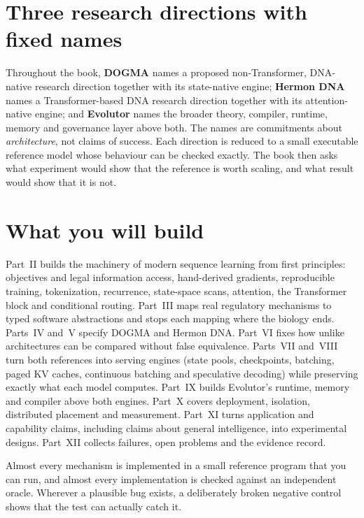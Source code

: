 \section*{Three research directions with fixed names}
Throughout the book, \textbf{DOGMA} names a proposed non-Transformer, DNA-native research
direction together with its state-native engine; \textbf{Hermon DNA} names a
Transformer-based DNA research direction together with its attention-native engine; and
\textbf{Evolutor} names the broader theory, compiler, runtime, memory and governance layer
above both. The names are commitments about \emph{architecture}, not claims of success.
Each direction is reduced to a small executable reference model whose behaviour can be
checked exactly. The book then asks what experiment would show that the reference is worth
scaling, and what result would show that it is not.

\section*{What you will build}
Part~II builds the machinery of modern sequence learning from first principles:
objectives and legal information access, hand-derived gradients, reproducible training,
tokenization, recurrence, state-space scans, attention, the Transformer block and
conditional routing. Part~III maps real regulatory mechanisms to typed software
abstractions and stops each mapping where the biology ends. Parts~IV and~V specify DOGMA
and Hermon DNA. Part~VI fixes how unlike architectures can be compared without false
equivalence. Parts~VII and~VIII turn both references into serving engines (state pools,
checkpoints, batching, paged KV caches, continuous batching and speculative decoding)
while preserving exactly what each model computes. Part~IX builds Evolutor's runtime,
memory and compiler above both engines. Part~X covers deployment, isolation, distributed
placement and measurement. Part~XI turns application and capability claims, including
claims about general intelligence, into experimental designs. Part~XII collects
failures, open problems and the evidence record.

Almost every mechanism is implemented in a small reference program that you can run, and
almost every implementation is checked against an independent oracle. Wherever a
plausible bug exists, a deliberately broken negative control shows that the test can
actually catch it.

